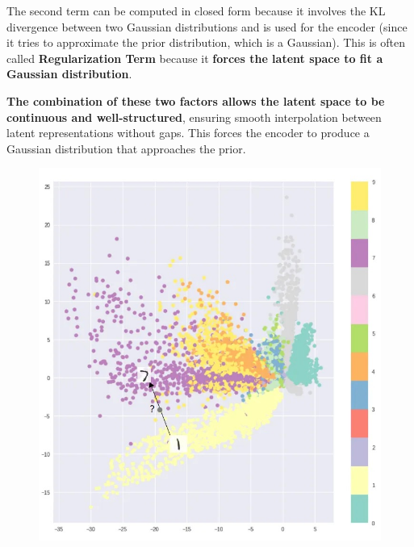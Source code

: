 The second term can be computed in closed form because it involves the KL divergence between two Gaussian distributions and is used for the encoder (since it tries to approximate the prior distribution, which is a Gaussian). This is often called \textbf{\textcolor{mybluee}{Regularization Term}} because it \textbf{forces the latent space to fit a Gaussian distribution}.

\textbf{The combination of these two factors allows the latent space to be continuous and well-structured}, ensuring smooth interpolation between latent representations without gaps. This forces the encoder to produce a Gaussian distribution that approaches the prior.

\begin{figure}[!htbp]
    \begin{minipage}[t]{.3\textwidth}
        \centering
        \includegraphics[width=\textwidth]{tikz/chapter9 - Latent Space VAEs 1.jpeg}
    \end{minipage}
    \hfill
    \begin{minipage}[t]{.3\textwidth}
        \centering

\end{minipage}
\end{figure}
